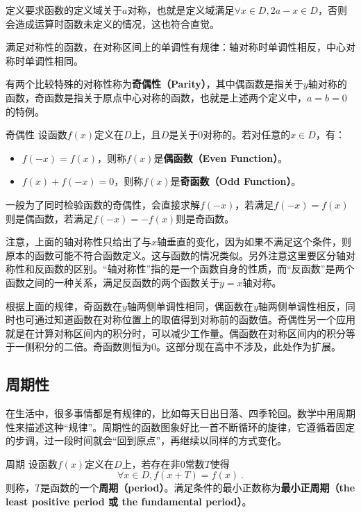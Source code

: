 定义要求函数的定义域关于$a$对称，也就是定义域满足$\forall x\in D,2a-x\in D$，否则会造成运算时函数未定义的情况，这也符合直觉。

满足对称性的函数，在对称区间上的单调性有规律：轴对称时单调性相反，中心对称时单调性相同。

有两个比较特殊的对称性称为\textbf{奇偶性（Parity）}，其中偶函数是指关于$y$轴对称的函数，奇函数是指关于原点中心对称的函数，也就是上述两个定义中，$a=b=0$的特例。

\begin{definition}{奇偶性}
设函数$f(x)$定义在$D$上，且$D$是关于$0$对称的。若对任意的$x\in D$，有：
\begin{itemize}
\item $f(-x)=f(x)$，则称$f(x)$是\textbf{偶函数（Even Function）}。
\item $f(x)+f(-x)=0$，则称$f(x)$是\textbf{奇函数（Odd Function）}。
\end{itemize}
\end{definition}

一般为了同时检验函数的奇偶性，会直接求解$f(-x)$，若满足$f(-x)=f(x)$则是偶函数，若满足$f(-x)=-f(x)$则是奇函数。

注意，上面的轴对称性只给出了与$x$轴垂直的变化，因为如果不满足这个条件，则原本的函数可能不符合函数定义。这与函数的情况类似。另外注意这里要区分轴对称性和反函数的区别。“轴对称性”指的是一个函数自身的性质，而“反函数”是两个函数之间的一种关系，满足反函数的两个函数关于$y=x$轴对称。

根据上面的规律，奇函数在$y$轴两侧单调性相同，偶函数在$y$轴两侧单调性相反，同时也可通过知道函数在对称位置上的取值得到对称前的函数值。奇偶性另一个应用就是在计算对称区间内的积分时，可以减少工作量。偶函数在对称区间内的积分等于一侧积分的二倍。奇函数则恒为0。这部分现在高中不涉及，此处作为扩展。

\subsection{周期性}

在生活中，很多事情都是有规律的，比如每天日出日落、四季轮回。数学中用周期性来描述这种“规律”。周期性的函数图象好比一首不断循环的旋律，它遵循着固定的步调，过一段时间就会“回到原点”，再继续以同样的方式变化。

\begin{definition}{周期}
设函数$f(x)$定义在$D$上，若存在非$0$常数$T$使得
\begin{equation}
\forall x\in D,f(x+T)=f(x)~.
\end{equation}
则称，$T$是函数的一个\textbf{周期（period）}。满足条件的最小正数称为\textbf{最小正周期（the least positive period 或 the fundamental period）}。
\end{definition}

